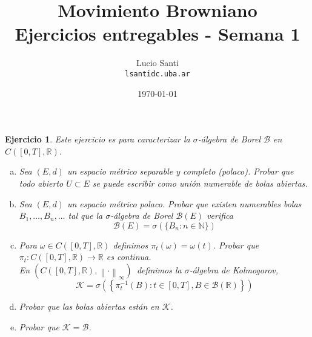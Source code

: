 \documentclass[a4paper,11pt]{article}
\title{Movimiento Browniano\\
      \small{Ejercicios entregables - Semana 1}}
\author{Lucio Santi\\
        \texttt{lsanti\at dc.uba.ar}}
\date{\today}
\newcommand{\norm}[1]{\left\lVert#1\right\rVert}
\newcommand{\CT}{\ensuremath{C([0,T], \mathbb{R})}}
\newcommand{\CTesp}{\ensuremath{(C([0,T], \mathbb{R}), \norm{\cdot}_{\infty})}}
\newcommand{\Bor}[1]{\ensuremath{\mathcal{B}(#1)}}
\newtheorem*{ej}{Ejercicio}
\begin{document}
\maketitle

\begin{ej} 
    Este ejercicio es para caracterizar la $\sigma$-álgebra de Borel
    $\mathcal{B}$ en \CT.

    \begin{enumerate}[a)]
        \item Sea $(E,d)$ un espacio métrico separable y completo (polaco).
        Probar que todo abierto $U \subset E$ se puede escribir como unión
        numerable de bolas abiertas.
        
        \item Sea $(E,d)$ un espacio métrico polaco. Probar que existen 
        numerables bolas $B_1, \dots, B_n, \dots$ tal que la $\sigma$-álgebra
        de Borel \Bor{E} verifica
        $$\Bor{E} = \sigma\left(\{B_n : n \in \mathbb{N} \}\right)$$

        \item Para $\omega \in \CT$ definimos $\pi_t(\omega) = \omega(t)$.
        Probar que $\pi_t : \CT \rightarrow \mathbb{R}$ es continua.\\

        En \CTesp \, definimos la $\sigma$-álgebra de Kolmogorov,
        $$\mathcal{K} = \sigma\left(\left\{\pi_{t}^{-1}(B) : t \in [0,T],
        B \in \Bor{\mathbb{R}} \right\}\right)$$

        \item Probar que las bolas abiertas están en $\mathcal{K}$.

        \item Probar que $\mathcal{K} = \mathcal{B}$.
    \end{enumerate}

\end{ej}
\end{document}
